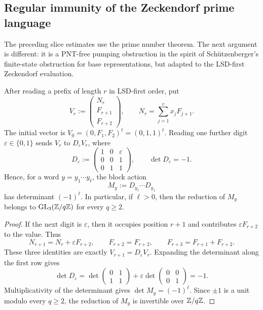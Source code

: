 \subsection{Regular immunity of the Zeckendorf prime language}
\label{subsec:zeckendorf-regular-immunity}

The preceding slice estimates use the prime number theorem. The next
argument is different: it is a PNT-free pumping obstruction in the
spirit of Sch\"utzenberger's finite-state obstruction for base
representations, but adapted to the LSD-first Zeckendorf evaluation.

\begin{lemma}
  \label{lem:zeckendorf-unimodular-block-action}
  After reading a prefix of length \(r\) in LSD-first order, put
  \[
    V_r:=
    \begin{pmatrix}
      N_r\\ F_{r+1}\\ F_{r+2}
    \end{pmatrix},
    \qquad
    N_r=\sum_{j=1}^r x_jF_{j+1}.
  \]
  The initial vector is \(V_0=(0,F_1,F_2)^t=(0,1,1)^t\). Reading one
  further digit \(\varepsilon\in\{0,1\}\) sends \(V_r\) to
  \(D_\varepsilon V_r\), where
  \[
    D_\varepsilon:=
    \begin{pmatrix}
      1&0&\varepsilon\\
      0&0&1\\
      0&1&1
    \end{pmatrix},
    \qquad
    \det D_\varepsilon=-1.
  \]
  Hence, for a word \(y=y_1\cdots y_\ell\), the block action
  \[
    M_y:=D_{y_\ell}\cdots D_{y_1}
  \]
  has determinant \((-1)^\ell\). In particular, if \(\ell>0\), then
  the reduction of \(M_y\) belongs to
  \(\operatorname{GL}_3(\mathbb{Z}/q\mathbb{Z})\) for every \(q\ge2\).
\end{lemma}

\begin{proof}
  If the next digit is \(\varepsilon\), then it occupies position
  \(r+1\) and contributes \(\varepsilon F_{r+2}\) to the value. Thus
  \[
    N_{r+1}=N_r+\varepsilon F_{r+2},\qquad
    F_{r+2}=F_{r+2},\qquad
    F_{r+3}=F_{r+1}+F_{r+2}.
  \]
  These three identities are exactly
  \(V_{r+1}=D_\varepsilon V_r\). Expanding the determinant along the
  first row gives
  \[
    \det D_\varepsilon
    =\det\begin{pmatrix}0&1\\1&1\end{pmatrix}
     +\varepsilon\det\begin{pmatrix}0&0\\0&1\end{pmatrix}
    =-1.
  \]
  Multiplicativity of the determinant gives
  \(\det M_y=(-1)^\ell\). Since \(\pm1\) is a unit modulo every
  \(q\ge2\), the reduction of \(M_y\) is invertible over
  \(\mathbb{Z}/q\mathbb{Z}\).
\end{proof}

